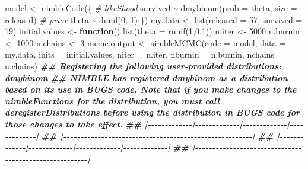 \documentclass[
  12pt,
]{krantz}
\newenvironment{Shaded}{\begin{snugshade}}{\end{snugshade}}
\newcommand{\AttributeTok}[1]{\textcolor[rgb]{0.77,0.63,0.00}{#1}}
\newcommand{\CommentTok}[1]{\textcolor[rgb]{0.56,0.35,0.01}{\textit{#1}}}
\newcommand{\ControlFlowTok}[1]{\textcolor[rgb]{0.13,0.29,0.53}{\textbf{#1}}}
\newcommand{\DecValTok}[1]{\textcolor[rgb]{0.00,0.00,0.81}{#1}}
\newcommand{\DocumentationTok}[1]{\textcolor[rgb]{0.56,0.35,0.01}{\textbf{\textit{#1}}}}
\newcommand{\FunctionTok}[1]{\textcolor[rgb]{0.00,0.00,0.00}{#1}}
\newcommand{\NormalTok}[1]{#1}
\newcommand{\OtherTok}[1]{\textcolor[rgb]{0.56,0.35,0.01}{#1}}
\newcommand{\SpecialCharTok}[1]{\textcolor[rgb]{0.00,0.00,0.00}{#1}}
\begin{document}
\begin{Shaded}
\begin{Highlighting}[]
\NormalTok{model }\OtherTok{\textless{}{-}} \FunctionTok{nimbleCode}\NormalTok{(\{}
 \CommentTok{\# likelihood}
\NormalTok{ survived }\SpecialCharTok{\textasciitilde{}} \FunctionTok{dmybinom}\NormalTok{(}\AttributeTok{prob =}\NormalTok{ theta, }\AttributeTok{size =}\NormalTok{ released)}
 \CommentTok{\# prior}
\NormalTok{ theta }\SpecialCharTok{\textasciitilde{}} \FunctionTok{dunif}\NormalTok{(}\DecValTok{0}\NormalTok{, }\DecValTok{1}\NormalTok{)}
\NormalTok{\})}
\NormalTok{my.data }\OtherTok{\textless{}{-}} \FunctionTok{list}\NormalTok{(}\AttributeTok{released =} \DecValTok{57}\NormalTok{, }\AttributeTok{survived =} \DecValTok{19}\NormalTok{)}
\NormalTok{initial.values }\OtherTok{\textless{}{-}} \ControlFlowTok{function}\NormalTok{() }\FunctionTok{list}\NormalTok{(}\AttributeTok{theta =} \FunctionTok{runif}\NormalTok{(}\DecValTok{1}\NormalTok{,}\DecValTok{0}\NormalTok{,}\DecValTok{1}\NormalTok{))}
\NormalTok{n.iter }\OtherTok{\textless{}{-}} \DecValTok{5000}
\NormalTok{n.burnin }\OtherTok{\textless{}{-}} \DecValTok{1000}
\NormalTok{n.chains }\OtherTok{\textless{}{-}} \DecValTok{3}
\NormalTok{mcmc.output }\OtherTok{\textless{}{-}} \FunctionTok{nimbleMCMC}\NormalTok{(}\AttributeTok{code =}\NormalTok{ model,}
 \AttributeTok{data =}\NormalTok{ my.data,}
 \AttributeTok{inits =}\NormalTok{ initial.values,}
 \AttributeTok{niter =}\NormalTok{ n.iter,}
 \AttributeTok{nburnin =}\NormalTok{ n.burnin,}
 \AttributeTok{nchains =}\NormalTok{ n.chains)}
\DocumentationTok{\#\# Registering the following user{-}provided distributions: dmybinom}
\DocumentationTok{\#\# NIMBLE has registered dmybinom as a distribution based on its use in BUGS code. Note that if you make changes to the nimbleFunctions for the distribution, you must call \textquotesingle{}deregisterDistributions\textquotesingle{} before using the distribution in BUGS code for those changes to take effect.}
\DocumentationTok{\#\# |{-}{-}{-}{-}{-}{-}{-}{-}{-}{-}{-}{-}{-}|{-}{-}{-}{-}{-}{-}{-}{-}{-}{-}{-}{-}{-}|{-}{-}{-}{-}{-}{-}{-}{-}{-}{-}{-}{-}{-}|{-}{-}{-}{-}{-}{-}{-}{-}{-}{-}{-}{-}{-}|}
\DocumentationTok{\#\# |{-}{-}{-}{-}{-}{-}{-}{-}{-}{-}{-}{-}{-}{-}{-}{-}{-}{-}{-}{-}{-}{-}{-}{-}{-}{-}{-}{-}{-}{-}{-}{-}{-}{-}{-}{-}{-}{-}{-}{-}{-}{-}{-}{-}{-}{-}{-}{-}{-}{-}{-}{-}{-}{-}{-}|}
\DocumentationTok{\#\# |{-}{-}{-}{-}{-}{-}{-}{-}{-}{-}{-}{-}{-}|{-}{-}{-}{-}{-}{-}{-}{-}{-}{-}{-}{-}{-}|{-}{-}{-}{-}{-}{-}{-}{-}{-}{-}{-}{-}{-}|{-}{-}{-}{-}{-}{-}{-}{-}{-}{-}{-}{-}{-}|}
\DocumentationTok{\#\# |{-}{-}{-}{-}{-}{-}{-}{-}{-}{-}{-}{-}{-}{-}{-}{-}{-}{-}{-}{-}{-}{-}{-}{-}{-}{-}{-}{-}{-}{-}{-}{-}{-}{-}{-}{-}{-}{-}{-}{-}{-}{-}{-}{-}{-}{-}{-}{-}{-}{-}{-}{-}{-}{-}{-}|}

\end{Highlighting}
\end{Shaded}
\end{document}
